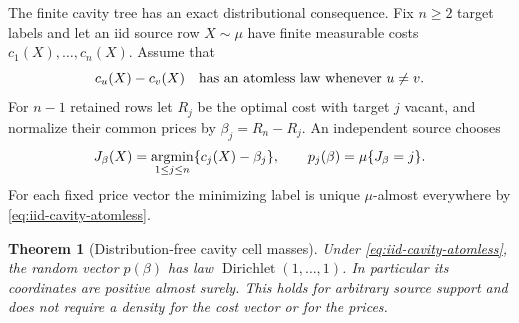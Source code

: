 \documentclass[11pt,reqno]{amsart}
\newtheorem{theorem}{Theorem}[section]
\theoremstyle{definition}
\theoremstyle{remark}
\numberwithin{equation}{section}
\begin{document}
The finite cavity tree has an exact distributional consequence. Fix
\(n\ge2\) target labels and let an iid source row \(X\sim\mu\) have
finite measurable costs \(c_1(X),\ldots,c_n(X)\). Assume that
\begin{equation}
\label{eq:iid-cavity-atomless}
  c_u(X)-c_v(X)\quad\hbox{has an atomless law whenever }u\ne v.
\end{equation}
For \(n-1\) retained rows let \(R_j\) be the optimal cost with target
\(j\) vacant, and normalize their common prices by
\(\beta_j=R_n-R_j\). An independent source chooses
\[
 J_\beta(X)=\mathop{\rm argmin}_{1\le j\le n}
                  \{c_j(X)-\beta_j\},\qquad
 p_j(\beta)=\mu\{J_\beta=j\}.
\]
For each fixed price vector the minimizing label is unique
\(\mu\)-almost everywhere by \eqref{eq:iid-cavity-atomless}.

\begin{theorem}[Distribution-free cavity cell masses]
\label{thm:iid-cavity-dirichlet}
Under \eqref{eq:iid-cavity-atomless}, the random vector
\(p(\beta)\) has law \(\operatorname{Dirichlet}(1,\ldots,1)\).
In particular its coordinates are positive almost surely. This holds
for arbitrary source support and does not require a density for the
cost vector or for the prices.
\end{theorem}
\end{document}
